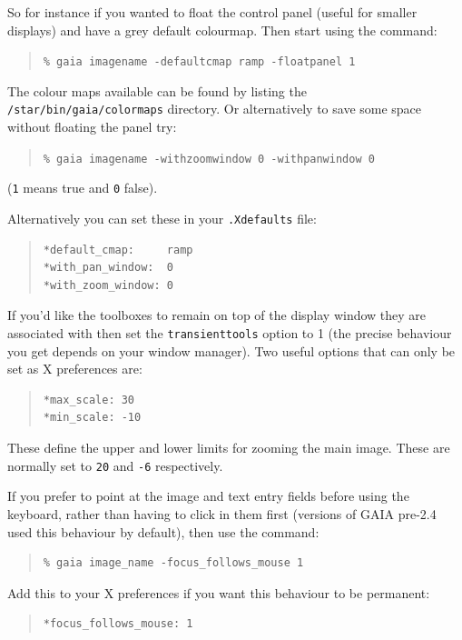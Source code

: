 \documentclass[twoside,11pt]{article}
\renewcommand{\_}{\texttt{\symbol{95}}}
\newcommand{\mytt}[1]{{\tt{#1}}}
\begin{document}
So for instance if you wanted to float the control panel (useful for
smaller displays) and have a grey default colourmap. Then start
using the command:
\begin{quote}
\mytt{\% gaia image\_name -default\_cmap ramp -float\_panel 1}
\end{quote}
The colour maps available can be found by listing the
\mytt{/star/bin/gaia/colormaps} directory. Or alternatively to save
some space without floating the panel try:
\begin{quote}
\mytt{\% gaia image\_name -with\_zoom\_window 0 -with\_pan\_window 0}
\end{quote}
(\mytt{1} means true and \mytt{0} false).

Alternatively you can set these in your \mytt{.Xdefaults} file:
\begin{quote}
\begin{verbatim}
*default_cmap:     ramp
*with_pan_window:  0
*with_zoom_window: 0
\end{verbatim}
\end{quote}

If you'd like the toolboxes to remain on top of the display window
they are associated with then set the \mytt{transient\_tools} option
to 1 (the precise behaviour you get depends on your window
manager). Two useful options that can only be set as X preferences
are:
\begin{quote}
\begin{verbatim}
*max_scale: 30
*min_scale: -10
\end{verbatim}
\end{quote}
These define the upper and lower limits for zooming the main
image. These are normally set to \mytt{20} and \mytt{-6}
respectively.

If you prefer to point at the image and text entry fields before using
the keyboard, rather than having to click in them first (versions of
GAIA pre-2.4 used this behaviour by default), then use the command:
\begin{quote}
\begin{verbatim}
% gaia image_name -focus_follows_mouse 1
\end{verbatim}
\end{quote}
Add this to your X preferences if you want this behaviour to be
permanent:
\begin{quote}
\begin{verbatim}
*focus_follows_mouse: 1
\end{verbatim}
\end{quote}
\end{document}
